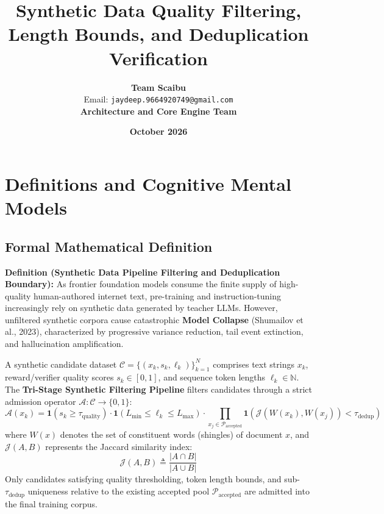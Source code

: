 \documentclass[11pt,a4paper]{article}
\title{\textbf{Synthetic Data Quality Filtering, Length Bounds, and Deduplication Verification}}
\author{\textbf{Team Scaibu} \\ \small Email: \texttt{jaydeep.9664920749@gmail.com} \\ \small \textbf{Architecture and Core Engine Team}}
\date{\textbf{October 2026}}
\theoremstyle{definition}
\begin{document}
\maketitle

\section{Definitions and Cognitive Mental Models}

\subsection{Formal Mathematical Definition}
\textbf{Definition (Synthetic Data Pipeline Filtering and Deduplication Boundary):}
As frontier foundation models consume the finite supply of high-quality human-authored internet text, pre-training and instruction-tuning increasingly rely on synthetic data generated by teacher LLMs. However, unfiltered synthetic corpora cause catastrophic \textbf{Model Collapse} (Shumailov et al., 2023), characterized by progressive variance reduction, tail event extinction, and hallucination amplification.

A synthetic candidate dataset $\mathcal{C} = \{ (x_k, s_k, \ell_k) \}_{k=1}^N$ comprises text strings $x_k$, reward/verifier quality scores $s_k \in [0, 1]$, and sequence token lengths $\ell_k \in \mathbb{N}$. The \textbf{Tri-Stage Synthetic Filtering Pipeline} filters candidates through a strict admission operator $\mathcal{A}: \mathcal{C} \to \{0, 1\}$:
{\boldmath
\begin{equation}
\mathcal{A}(x_k) = \mathbf{1}\left( s_k \ge \tau_{\text{quality}} \right) \cdot \mathbf{1}\left( L_{\min} \le \ell_k \le L_{\max} \right) \cdot \prod_{x_j \in \mathcal{P}_{\text{accepted}}} \mathbf{1}\left( \mathcal{J}(W(x_k), W(x_j)) < \tau_{\text{dedup}} \right)
\end{equation}
}
where $W(x)$ denotes the set of constituent words (shingles) of document $x$, and $\mathcal{J}(A, B)$ represents the Jaccard similarity index:
{\boldmath
\begin{equation}
\mathcal{J}(A, B) \triangleq \frac{|A \cap B|}{|A \cup B|}
\end{equation}
}
Only candidates satisfying quality thresholding, token length bounds, and sub-$\tau_{\text{dedup}}$ uniqueness relative to the existing accepted pool $\mathcal{P}_{\text{accepted}}$ are admitted into the final training corpus.
\end{document}
